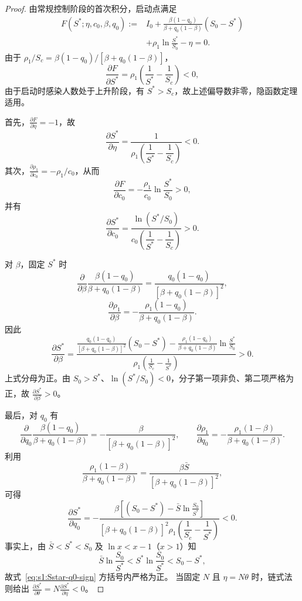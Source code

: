 \documentclass[lang=cn,a4paper,newtx]{elegantpaper}
\numberwithin{equation}{section}
\theoremstyle{plain}
\begin{document}
\begin{proof}
由常规控制阶段的首次积分，启动点满足
\begin{equation}
\begin{aligned}
F(S^*;\eta,c_0,\beta,q_0)
:={}&
I_0+
\frac{\beta(1-q_0)}
{\beta+q_0(1-\beta)}
(S_0-S^*) \\
&+
\rho_1\ln\frac{S^*}{S_0}
-\eta
=0.
\end{aligned}
\label{eq:s1:F-Sstar-param}
\end{equation}
由于 $\rho_1/S_c=\beta(1-q_0)/[\beta+q_0(1-\beta)]$，
\[
\frac{\partial F}{\partial S^*}
=
\rho_1
\left(
\frac1{S^*}-\frac1{S_c}
\right)<0,
\]
由于启动时感染人数处于上升阶段，有 $S^*>S_c$，故上述偏导数非零，隐函数定理适用。

首先，$\frac{\partial F}{\partial \eta}=-1$，故
\begin{equation}
\frac{\partial S^*}{\partial \eta}
=
\frac{1}{
\rho_1
\left(
\dfrac1{S^*}-\dfrac1{S_c}
\right)
}
<0.
\label{eq:s1:Sstar-eta-sign}
\end{equation}
其次，$\frac{\partial \rho_1}{\partial c_0}=-\rho_1/c_0$，从而
\[
\frac{\partial F}{\partial c_0}
=
-\frac{\rho_1}{c_0}\ln\frac{S^*}{S_0}>0,
\]
并有
\begin{equation}
\frac{\partial S^*}{\partial c_0}
=
\frac{\ln(S^*/S_0)}
{c_0
\left(
\dfrac1{S^*}-\dfrac1{S_c}
\right)
}
>0.
\label{eq:s1:Sstar-c0-sign}
\end{equation}

对 $\beta$，固定 $S^*$ 时
\[
\frac{\partial}{\partial\beta}
\frac{\beta(1-q_0)}
{\beta+q_0(1-\beta)}
=
\frac{q_0(1-q_0)}
{\left[\beta+q_0(1-\beta)\right]^2},
\]
\[
\frac{\partial \rho_1}{\partial \beta}
=
-\frac{\rho_1(1-q_0)}
{\beta+q_0(1-\beta)}.
\]
因此
\begin{equation}
\frac{\partial S^*}{\partial \beta}
=
\frac{
\displaystyle
\frac{q_0(1-q_0)}
{\left[\beta+q_0(1-\beta)\right]^2}
(S_0-S^*)
-
\frac{\rho_1(1-q_0)}
{\beta+q_0(1-\beta)}
\ln\frac{S^*}{S_0}
}{
\displaystyle
\rho_1
\left(
\frac1{S_c}-\frac1{S^*}
\right)
}
>0.
\label{eq:s1:Sstar-beta-sign}
\end{equation}
上式分母为正。由 $S_0>S^*$、$\ln(S^*/S_0)<0$，分子第一项非负、第二项严格为正，故 $\frac{\partial S^*}{\partial \beta}>0$。

最后，对 $q_0$ 有
\[
\frac{\partial}{\partial q_0}
\frac{\beta(1-q_0)}
{\beta+q_0(1-\beta)}
=
-\frac{\beta}
{\left[\beta+q_0(1-\beta)\right]^2},
\qquad
\frac{\partial \rho_1}{\partial q_0}
=
-\frac{\rho_1(1-\beta)}
{\beta+q_0(1-\beta)}.
\]
利用
\[
\frac{\rho_1(1-\beta)}
{\beta+q_0(1-\beta)}
=
\frac{\beta\bar S}
{\left[\beta+q_0(1-\beta)\right]^2},
\]
可得
\begin{equation}
\frac{\partial S^*}{\partial q_0}
=
-\frac{
\beta
\left[
(S_0-S^*)
-\bar S\ln\frac{S_0}{S^*}
\right]
}{
\left[\beta+q_0(1-\beta)\right]^2
\rho_1
\left(
\dfrac1{S_c}-\dfrac1{S^*}
\right)
}
<0.
\label{eq:s1:Sstar-q0-sign}
\end{equation}
事实上，由 $\bar S<S^*<S_0$ 及 $\ln x<x-1$（$x>1$）知
\[
\bar S\ln\frac{S_0}{S^*}
<
S^*\ln\frac{S_0}{S^*}
<
S_0-S^*,
\]
故式~\eqref{eq:s1:Sstar-q0-sign} 方括号内严格为正。
当固定 $N$ 且 $\eta=N\theta$ 时，链式法则给出
$\frac{\partial S^*}{\partial \theta}=N\frac{\partial S^*}{\partial \eta}<0$。
\end{proof}
\end{document}
